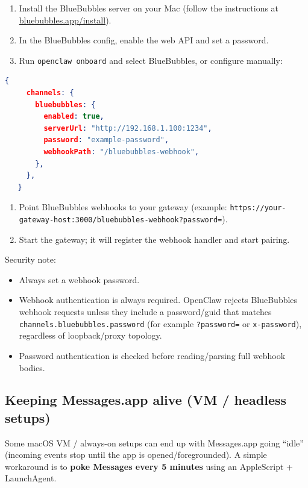\begin{enumerate}
  \item Install the BlueBubbles server on your Mac (follow the instructions at \href{https://bluebubbles.app/install}{bluebubbles.app/install}).
  \item In the BlueBubbles config, enable the web API and set a password.
  \item Run \texttt{openclaw onboard} and select BlueBubbles, or configure manually:
\end{enumerate}


\begin{lstlisting}[language=json]
   {
     channels: {
       bluebubbles: {
         enabled: true,
         serverUrl: "http://192.168.1.100:1234",
         password: "example-password",
         webhookPath: "/bluebubbles-webhook",
       },
     },
   }
\end{lstlisting}


\begin{enumerate}
  \item Point BlueBubbles webhooks to your gateway (example: \texttt{https://your-gateway-host:3000/bluebubbles-webhook?password=}).
  \item Start the gateway; it will register the webhook handler and start pairing.
\end{enumerate}


Security note:

\begin{itemize}
  \item Always set a webhook password.
  \item Webhook authentication is always required. OpenClaw rejects BlueBubbles webhook requests unless they include a password/guid that matches \texttt{channels.bluebubbles.password} (for example \texttt{?password=} or \texttt{x-password}), regardless of loopback/proxy topology.
  \item Password authentication is checked before reading/parsing full webhook bodies.
\end{itemize}


\subsection{Keeping Messages.app alive (VM / headless setups)}


Some macOS VM / always-on setups can end up with Messages.app going “idle” (incoming events stop until the app is opened/foregrounded). A simple workaround is to \textbf{poke Messages every 5 minutes} using an AppleScript + LaunchAgent.

